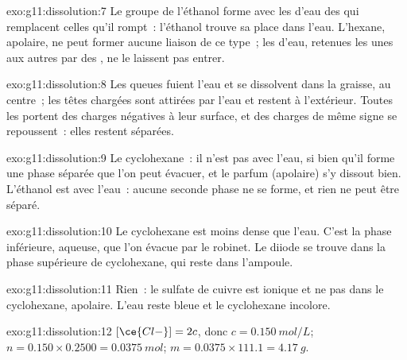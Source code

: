 \begin{solution}{exo:g11:dissolution:7}
Le groupe  de l'éthanol forme avec les  d'eau des
 qui remplacent celles qu'il rompt~: l'éthanol trouve
sa place dans l'eau. L'hexane, apolaire, ne peut former aucune liaison
de ce type~; les  d'eau, retenues les unes aux autres par des
, ne le laissent pas entrer.
\end{solution}

\begin{solution}{exo:g11:dissolution:8}
Les queues  fuient l'eau et se dissolvent dans la graisse, au
centre~; les têtes chargées sont attirées par l'eau et restent à
l'extérieur. Toutes les  portent des charges négatives à leur
surface, et des charges de même signe se repoussent~: elles restent
séparées.
\end{solution}

\begin{solution}{exo:g11:dissolution:9}
Le cyclohexane~: il n'est pas  avec l'eau, si bien qu'il forme
une phase séparée que l'on peut évacuer, et le parfum (apolaire) s'y
dissout bien. L'éthanol est  avec l'eau~: aucune seconde phase
ne se forme, et rien ne peut être séparé.
\end{solution}

\begin{solution}{exo:g11:dissolution:10}
Le cyclohexane est moins dense que l'eau. C'est la phase inférieure,
aqueuse, que l'on évacue par le robinet. Le diiode se trouve dans la
phase supérieure de cyclohexane, qui reste dans l'ampoule.
\end{solution}

\begin{solution}{exo:g11:dissolution:11}
Rien~: le sulfate de cuivre est ionique et ne  pas dans le
cyclohexane, apolaire. L'eau reste bleue et le cyclohexane incolore.
\end{solution}

\begin{solution}{exo:g11:dissolution:12}
$[\ce{Cl-}] = 2c$, donc $c = \qty{0.150}{mol/L}$;
$n = 0.150 \times 0.2500 = \qty{0.0375}{mol}$;
$m = 0.0375 \times 111.1 = \qty{4.17}{g}$.
\end{solution}

